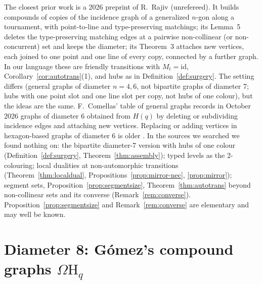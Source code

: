 \documentclass[11pt]{amsart}
\theoremstyle{definition}
\theoremstyle{remark}
\numberwithin{equation}{section}
\newcommand{\Om}{\Omega\mathrm H}
\begin{document}
The closest prior work is a 2026 preprint of R.~Rajiv \cite{Ra26} (unrefereed). It builds compounds of copies of the
incidence graph of a generalized $n$-gon along a tournament, with point-to-line and type-preserving matchings; its Lemma~5
deletes the type-preserving matching edges at a pairwise non-collinear (or non-concurrent) set and keeps the diameter;
its Theorem~3 attaches new vertices, each joined to one point and one line of every copy, connected by a further graph. In
our language these are friendly transitions with $M_t=\mathrm{id}$, Corollary~\ref{cor:autotrans}(1), and hubs as in
Definition~\ref{def:surgery}. The setting differs (general graphs of diameter $n=4,6$, not bipartite graphs of diameter 7;
hubs with one point slot and one line slot per copy, not hubs of one colour), but the ideas are the same. F.~Comellas'
table of general graphs \cite{Co26} records in October 2026 graphs of diameter 6 obtained from $H(q)$ by deleting or
subdividing incidence edges and attaching new vertices. Replacing or adding vertices in hexagon-based graphs of diameter 6
is older \cite{CG94,GPB99,PGMP09}. In the sources we searched we found nothing on: the bipartite diameter-7 version with
hubs of one colour (Definition~\ref{def:surgery}, Theorem~\ref{thm:assembly}); typed levels as the 2-colouring; local
dualities at non-automorphic transitions (Theorem~\ref{thm:localdual}, Propositions~\ref{prop:mirror-nec},
\ref{prop:mirror}); segment sets, Proposition~\ref{prop:segmentsize}, Theorem~\ref{thm:autotrans} beyond non-collinear sets
and its converse (Remark~\ref{rem:converse}). Proposition~\ref{prop:segmentsize} and Remark~\ref{rem:converse} are
elementary and may well be known.

\section{Diameter 8: G\'omez's compound graphs $\Om_q$}\label{sec:d8}

\end{document}
